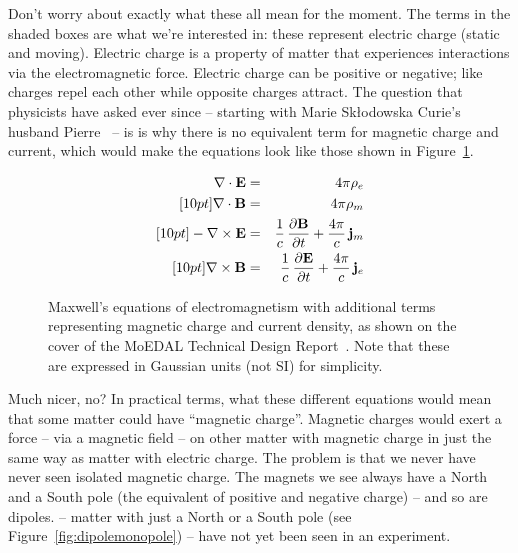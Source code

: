 %
Don't worry about exactly what these all mean for the moment.
The terms in the shaded boxes are what we're interested in:
these represent electric charge (static and moving).
Electric charge is a property of matter that experiences
interactions via the electromagnetic force.
Electric charge can be positive or negative; like charges repel
each other while opposite charges attract.
%
The question that physicists have asked ever since -- starting
with Marie Skłodowska Curie's husband Pierre~\cite{Curie1894} -- is
is why there is no equivalent term for magnetic charge and current,
which would make the equations look like those shown in
Figure~\ref{fig:maxwellseqsmagcharge}.

\begin{figure}[htbp]
  \centering
\begin{eqnarray}
\label{eq:1m} \mathbf{\nabla} \cdot \mathbf{E} & = & 4 \pi \rho_{e}\\ [10pt]
\label{eq:2m} \mathbf{\nabla} \cdot \mathbf{B} & = & 4 \pi \rho_{m}\\ [10pt]
\label{eq:3m} - \mathbf{\nabla} \times \mathbf{E} & = & \frac{1}{c} \, \frac{\partial \mathbf{B}}{\partial t} + \frac{4 \pi}{c} \, \mathbf{j}_{m}\\ [10pt]
\label{eq:4m}   \mathbf{\nabla} \times \mathbf{B} & = & \frac{1}{c} \, \frac{\partial \mathbf{E}}{\partial t} + \frac{4 \pi}{c} \, \mathbf{j}_{e}
\end{eqnarray}
  \caption[Maxwell's equations of electromagnetism with magnetic charge]
  {\label{fig:maxwellseqsmagcharge}Maxwell's equations of electromagnetism with additional terms representing magnetic charge and current density, as shown on the cover of the MoEDAL Technical Design Report~\cite{MoEDAL2009}. Note that these are expressed in Gaussian units (not SI) for simplicity.}
\end{figure}

Much nicer, no? In practical terms, what these different equations would
mean that some matter could have ``magnetic charge''.
Magnetic charges would exert a force -- via a magnetic field -- on
other matter with magnetic charge in just the same way as matter
with electric charge.
The problem is that we never have never seen isolated magnetic charge.
The magnets we see always have a North and a South pole
(the equivalent of positive and negative charge) -- and so are dipoles.
 -- matter with just a North or a
South pole (see Figure~\ref{fig:dipolemonopole}) -- have not yet
been seen in an experiment.

